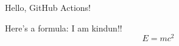 \documentclass{article}
\begin{document}
Hello, GitHub Actions!

Here's a formula:
I am kindun!!
\[
E = mc^2
\]
\end{document}
